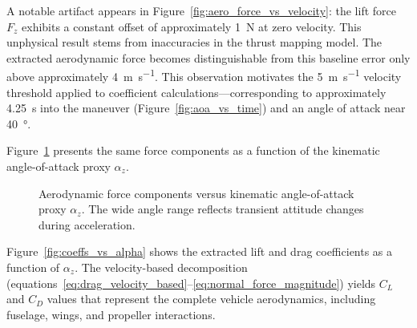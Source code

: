 A notable artifact appears in Figure~\ref{fig:aero_force_vs_velocity}: the lift force $F_z$ exhibits a constant offset of approximately \SI{1}{\newton} at zero velocity.
This unphysical result stems from inaccuracies in the thrust mapping model.
The extracted aerodynamic force becomes distinguishable from this baseline error only above approximately \SI{4}{\meter\per\second}.
This observation motivates the \SI{5}{\meter\per\second} velocity threshold applied to coefficient calculations—corresponding to approximately \SI{4.25}{\second} into the maneuver (Figure~\ref{fig:aoa_vs_time}) and an angle of attack near \SI{40}{\degree}.

Figure~\ref{fig:aero_force_vs_alpha} presents the same force components as a function of the kinematic angle-of-attack proxy $\alpha_z$.

\begin{figure}[htbp]
  \centering
  \caption{Aerodynamic force components versus kinematic angle-of-attack proxy $\alpha_z$. The wide angle range reflects transient attitude changes during acceleration.}
  \label{fig:aero_force_vs_alpha}
\end{figure}

Figure~\ref{fig:coeffs_vs_alpha} shows the extracted lift and drag coefficients as a function of $\alpha_z$.
The velocity-based decomposition (equations~\eqref{eq:drag_velocity_based}--\eqref{eq:normal_force_magnitude}) yields $C_L$ and $C_D$ values that represent the complete vehicle aerodynamics, including fuselage, wings, and propeller interactions.

